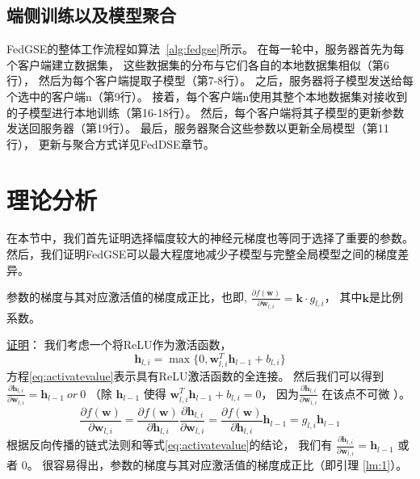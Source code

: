 \subsection{端侧训练以及模型聚合}
FedGSE的整体工作流程如算法~\ref{alg:fedgse}所示。
在每一轮中，服务器首先为每个客户端建立数据集，
这些数据集的分布与它们各自的本地数据集相似（第6行），
然后为每个客户端提取子模型（第7-8行）。
之后，服务器将子模型发送给每个选中的客户端n（第9行）。
接着，每个客户端n使用其整个本地数据集对接收到的子模型进行本地训练（第16-18行）。
然后，每个客户端将其子模型的更新参数发送回服务器（第19行）。
最后，服务器聚合这些参数以更新全局模型（第11行），
更新与聚合方式详见FedDSE章节。


\section{理论分析}
在本节中，我们首先证明选择幅度较大的神经元梯度也等同于选择了重要的参数。
然后，我们证明FedGSE可以最大程度地减少子模型与完整全局模型之间的梯度差异。
\begin{lemma}\label{lm:1}
    参数的梯度与其对应激活值的梯度成正比，也即, 
    $\frac{\partial f(\mathbf{w})}{\partial \mathbf{w}_{l, i}} 
    =\mathbf{k} \cdot g_{l,i}$，
    其中$\mathbf{k}$是比例系数。
\end{lemma}
\underline{证明}：
我们考虑一个将ReLU作为激活函数，
\begin{equation}
    \label{eq:activatevalue}
    \mathbf{h}_{l,i} = \max  {\{ 0, \mathbf{w}_{l,i}^T \mathbf{h}_{l-1} + b_{l,i}  \}} 
\end{equation}
方程\ref{eq:activatevalue}表示具有ReLU激活函数的全连接。
然后我们可以得到
$\frac{\partial \mathbf{h}_{l,i}}{\partial \mathbf{w}_{l,i}} 
= \mathbf{h}_{l-1} \ or\  0 $
（除 $\mathbf{h}_{l-1}$ 使得 
$\mathbf{w}_{l,i}^T \mathbf{h}_{l-1} + b_{l,i}=0$，
因为$\frac{\partial \mathbf{h}_{l,i}}{\partial \mathbf{w}_{l,i}}$ 
在该点不可微
）。
\begin{equation}
    \label{eq:sgd}
     \frac{\partial f(\mathbf{w})}{\partial \mathbf{w}_{l, i}} = \frac{\partial f(\mathbf{w})}{\partial \mathbf{h}_{l,i}} \frac{\partial \mathbf{h}_{l,i}}{\partial \mathbf{w}_{l,i}}
  = \frac{\partial f(\mathbf{w})}{\partial \mathbf{h}_{l,i}} \mathbf{h}_{l-1}= g_{l,i} \mathbf{h}_{l-1}
\end{equation}
根据反向传播的链式法则和等式\ref{eq:activatevalue}的结论，
我们有  $\frac{\partial \mathbf{h}_{l,i}}{\partial \mathbf{w}_{l,i}}
 = \mathbf{h}_{l-1}$ 或者 $ 0 $。
很容易得出，参数的梯度与其对应激活值的梯度成正比（即引理 \ref{lm:1}）。

